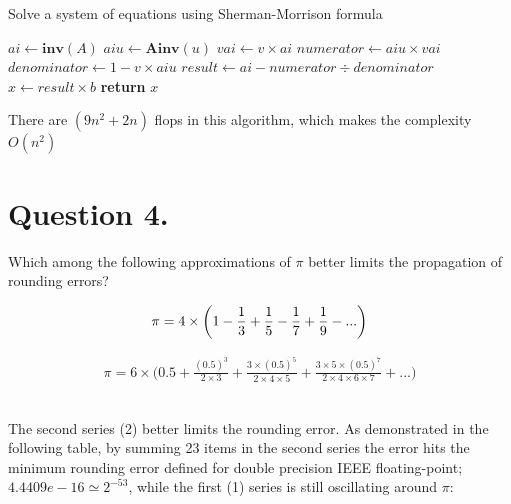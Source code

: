 \documentclass[a4paper,11pt]{article}
\begin{document}
\begin{algorithm}
\caption{Solve a system of equations using Sherman-Morrison formula}\label{euclid}
    \begin{algorithmic}[1]
        \State $ai\gets \textbf{inv}(A)$ 
        \State $aiu\gets \textbf{Ainv}(u)$ 
        \State $vai\gets v\times ai$ 
        \State $numerator\gets aiu\times vai$ 
        \State $denominator\gets 1 - v \times aiu$ 
        \State $result\gets ai - numerator \div denominator$ 
        \State $x\gets result \times b$ 
        \State \textbf{return} $x$
        \EndProcedure
    \end{algorithmic}
\end{algorithm}
\noindent
There are $(9n^2+2n)$ flops in this algorithm, which makes the complexity $O(n^2)$ 

\section*{Question 4.}
Which among the following approximations of $\pi$ better limits the propagation of rounding errors?

\begin{align}
\setcounter{equation}{0}
\pi = 4 \times \bigg(1 - \frac{1}{3} + \frac{1}{5} - \frac{1}{7} + \frac{1}{9}-...\bigg)
\end{align}

\begin{align}
\pi = 6 \times \bigg(0.5 + \frac{(0.5)^3}{2\times3} + \frac{3\times(0.5)^5}{2\times4\times5}+\frac{3\times5\times(0.5)^7}{2\times4\times6\times7}+...\bigg)
\end{align}
\\
\begin{margin}{0.5cm}{0.5cm}
The second series (2) better limits the rounding error. As demonstrated in the following table, by summing 23 items in the second series the error hits the minimum rounding error defined for double precision IEEE floating-point; $4.4409e-16 \simeq 2^{-53}$, while the first (1) series is still oscillating around $\pi$:
\end{margin}
\end{document}
